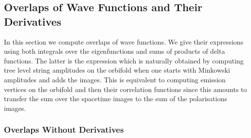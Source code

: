 \subsection{Overlaps of Wave Functions and Their Derivatives}

In this section we compute overlaps of wave functions.
We give their expressions using both integrals over the eigenfunctions and sums of products of delta functions.
The latter is the expression which is naturally obtained by computing tree level string amplitudes on the orbifold when one starts with Minkowski amplitudes and adds the images.
This is equivalent to computing emission vertices on the orbifold and then their correlation functions since this amounts to transfer the sum over the spacetime images to the sum of the polarisations images.


\subsubsection{Overlaps Without Derivatives}

